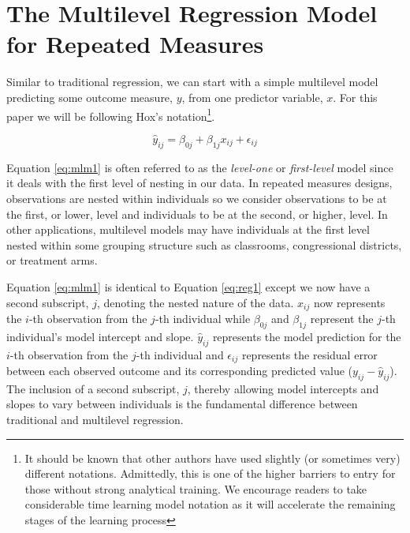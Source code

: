 \documentclass[
]{article}
\begin{document}
\hypertarget{the-multilevel-regression-model-for-repeated-measures}{%
\section{The Multilevel Regression Model for Repeated Measures}\label{the-multilevel-regression-model-for-repeated-measures}}

Similar to traditional regression, we can start with a simple multilevel model predicting some outcome measure, \(y\), from one predictor variable, \(x\). For this paper we will be following Hox's \cite{hox2017} notation\footnote{It should be known that other authors have used slightly (or sometimes very) different notations. Admittedly, this is one of the higher barriers to entry for those without strong analytical training. We encourage readers to take considerable time learning model notation as it will accelerate the remaining stages of the learning process}.

\begin{equation}
\hat{y}_{ij}=\beta_{0j}+\beta_{1j}x_{ij}+\epsilon_{ij}
\label{eq:mlm1}
\end{equation}

\noindent
Equation \ref{eq:mlm1} is often referred to as the \emph{level-one} or \emph{first-level} model since it deals with the first level of nesting in our data. In repeated measures designs, observations are nested within individuals so we consider observations to be at the first, or lower, level and individuals to be at the second, or higher, level. In other applications, multilevel models may have individuals at the first level nested within some grouping structure such as classrooms, congressional districts, or treatment arms.

Equation \ref{eq:mlm1} is identical to Equation \ref{eq:reg1} except we now have a second subscript, \(j\), denoting the nested nature of the data. \(x_{ij}\) now represents the \(i\)-th observation from the \(j\)-th individual while \(\beta_{0j}\) and \(\beta_{1j}\) represent the \(j\)-th individual's model intercept and slope. \(\hat{y}_{ij}\) represents the model prediction for the \(i\)-th observation from the \(j\)-th individual and \(\epsilon_{ij}\) represents the residual error between each observed outcome and its corresponding predicted value (\(y_{ij}-\hat{y}_{ij}\)). The inclusion of a second subscript, \(j\), thereby allowing model intercepts and slopes to vary between individuals is the fundamental difference between traditional and multilevel regression.
\end{document}
